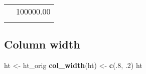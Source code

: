 \documentclass[]{article}
\newenvironment{Shaded}{\begin{snugshade}}{\end{snugshade}}
\newcommand{\KeywordTok}[1]{\textcolor[rgb]{0.13,0.29,0.53}{\textbf{{#1}}}}
\newcommand{\DecValTok}[1]{\textcolor[rgb]{0.00,0.00,0.81}{{#1}}}
\newcommand{\StringTok}[1]{\textcolor[rgb]{0.31,0.60,0.02}{{#1}}}
\newcommand{\NormalTok}[1]{{#1}}
\begin{document}
\begin{table}[h]
\begin{centering}
\begin{tabularx}{0.333333333333333\textwidth}{p{} p{}}
\arrayrulecolor{black}
\multicolumn{1}{|l|}{\rule{0pt}{\baselineskip+4pt}\hspace*{4pt}Thyme\hspace*{4pt}\rule[-4pt]{0pt}{4pt}} & \multicolumn{1}{l|}{\rule{0pt}{\baselineskip+4pt}\hspace*{4pt}100000.00\hspace*{4pt}\rule[-4pt]{0pt}{4pt}} \tabularnewline[-0.5pt]
\hhline{>{\arrayrulecolor{black}}|>{\arrayrulecolor{black}}->{\arrayrulecolor{black}}|>{\arrayrulecolor{black}}-}
\arrayrulecolor{black}
\end{tabularx}
\par\end{centering}
\end{table}

\FloatBarrier

\subsection{Column width}\label{column-width}

\begin{Shaded}
\begin{Highlighting}[]
\NormalTok{ht <-}\StringTok{ }\NormalTok{ht_orig}
\KeywordTok{col_width}\NormalTok{(ht) <-}\StringTok{ }\KeywordTok{c}\NormalTok{(.}\DecValTok{8}\NormalTok{, .}\DecValTok{2}\NormalTok{)}
\NormalTok{ht}
\end{Highlighting}
\end{Shaded}
\end{document}
